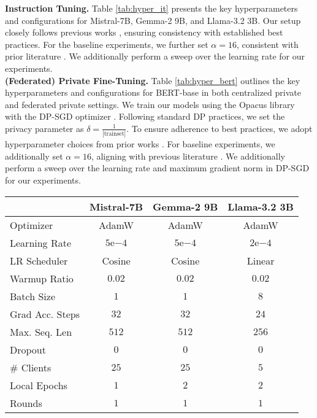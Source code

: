 \textbf{Instruction Tuning.}
Table \ref{tab:hyper_it} presents the key hyperparameters and configurations for Mistral-7B, Gemma-2 9B, and Llama-3.2 3B. 
Our setup closely follows previous works \citep{cr-dataset, ponkshe2024initialization}, ensuring consistency with established best practices.
For the baseline experiments, we further set $\alpha = 16$, consistent with prior literature \citep{singhal2024exact, sun2024improving}.
We additionally perform a sweep over the learning rate for our experiments.
\\

\textbf{(Federated) Private Fine-Tuning.}
Table \ref{tab:hyper_bert} outlines the key hyperparameters and configurations for BERT-base in both centralized private and federated private settings. 
We train our models using the Opacus library \citep{yousefpour2021opacus} with the DP-SGD optimizer \citep{dgsgd}. 
Following standard DP practices, we set the privacy parameter as \(\delta = \frac{1}{|\text{trainset}|}\). 
To ensure adherence to best practices, we adopt hyperparameter choices from prior works \citep{singhal2024exact, lora}. For baseline experiments, we additionally set \(\alpha = 16\), aligning with previous literature \citep{singhal2024exact, sun2024improving}. 
We additionally perform a sweep over the learning rate and maximum gradient norm in DP-SGD for our experiments.


\begin{table*}[!h]
\centering
\begin{tabular}{lccc}
\toprule
 & \textbf{Mistral-7B} & \textbf{Gemma-2 9B} & \textbf{Llama-3.2 3B}\\
\midrule
Optimizer        & AdamW      & AdamW      & AdamW      \\
Learning Rate    & $5\mathrm{e}{-4}$ & $5\mathrm{e}{-4}$ & $2\mathrm{e}{-4}$ \\
LR Scheduler     & Cosine     & Cosine     & Linear     \\
Warmup Ratio     & $0.02$     & $0.02$     & $0.02$     \\
Batch Size       & $1$        & $1$        & $8$        \\
Grad Acc. Steps  & $32$       & $32$       & $24$       \\
Max. Seq. Len    & $512$      & $512$      & $256$      \\
Dropout          & $0$        & $0$        & $0$        \\
\# Clients   & $25$       & $25$       & $5$        \\
Local Epochs     & $1$        & $2$        & $2$        \\
Rounds           & $1$        & $1$        & $1$        \\
\bottomrule
\end{tabular}
\caption{Hyperparameter settings for Mistral-7B, Gemma-2 9B, and Llama-3.2 3B.}
\label{tab:hyper_it}
\end{table*}

